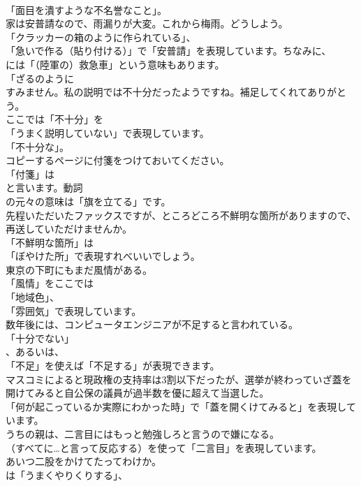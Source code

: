 \documentclass[8pt]{extreport}
\begin{document}
\begin{CJK}{UTF8}{min}
\\	「面目を潰すような不名誉なこと」。	
\\	家は安普請なので、雨漏りが大変。これから梅雨。どうしよう。 
\\	「クラッカーの箱のように作られている」、
\\	「急いで作る（貼り付ける）」で「安普請」を表現しています。ちなみに、
\\	には「（陸軍の）救急車」という意味もあります。
\\	「ざるのように	
\\	すみません。私の説明では不十分だったようですね。補足してくれてありがとう。 
\\	ここでは「不十分」を
\\	「うまく説明していない」で表現しています。
\\	「不十分な」。	
\\	コピーするページに付箋をつけておいてください。 
\\	「付箋」は
\\	と言います。動詞
\\	の元々の意味は「旗を立てる」です。	
\\	先程いただいたファックスですが、ところどころ不鮮明な箇所がありますので、再送していただけませんか。 
\\	「不鮮明な箇所」は
\\	「ぼやけた所」で表現すれべいいでしょう。	
\\	東京の下町にもまだ風情がある。 
\\	「風情」をここでは
\\	「地域色」、
\\	「雰囲気」で表現しています。	
\\	数年後には、コンピュータエンジニアが不足すると言われている。 
\\	「十分でない」 
\\	、あるいは、
\\	「不足」を使えば「不足する」が表現できます。	
\\	マスコミによると現政権の支持率は3割以下だったが、選挙が終わっていざ蓋を開けてみると自公保の議員が過半数を優に超えて当選した。 
\\	「何が起こっているか実際にわかった時」で「蓋を開くけてみると」を表現しています。	
\\	うちの親は、二言目にはもっと勉強しろと言うので嫌になる。 
\\	（すべてに…と言って反応する）を使って「二言目」を表現しています。	
\\	あいつ二股をかけてたってわけか。 
\\	は「うまくやりくりする」、

\end{CJK}
\end{document}

